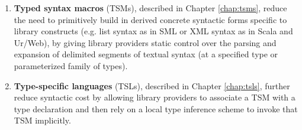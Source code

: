 \begin{enumerate}
\item \textbf{Typed syntax macros} (TSMs), described in Chapter \ref{chap:tsms}, reduce the need to primitively build in derived concrete syntactic forms specific to library constructs (e.g. list syntax as in SML or XML syntax as in Scala and Ur/Web), by giving library providers static control over the parsing and expansion of delimited segments of textual syntax (at a specified type or parameterized family of types). 
\item \textbf{Type-specific languages} (TSLs), described in Chapter \ref{chap:tsls}, further reduce syntactic cost by allowing library providers to associate a TSM with a type declaration and then rely on a local type inference scheme to invoke that TSM implicitly.
\end{enumerate} 
